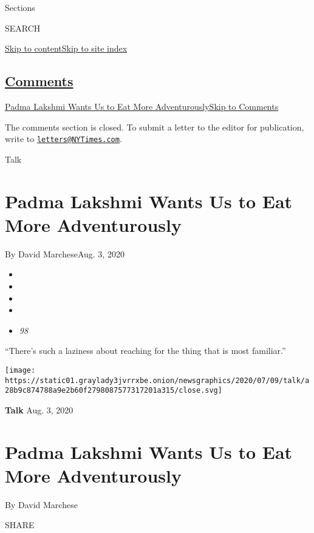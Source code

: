 Sections

SEARCH

\protect\hyperlink{site-content}{Skip to
content}\protect\hyperlink{site-index}{Skip to site index}

\hypertarget{comments}{%
\subsection{\texorpdfstring{\protect\hyperlink{commentsContainer}{Comments}}{Comments}}\label{comments}}

\href{}{Padma Lakshmi Wants Us to Eat More Adventurously}\href{}{Skip to
Comments}

The comments section is closed. To submit a letter to the editor for
publication, write to
\href{mailto:letters@NYTimes.com}{\nolinkurl{letters@NYTimes.com}}.

Talk

\hypertarget{padma-lakshmi-wants-us-to-eat-more-adventurously}{%
\section{Padma Lakshmi Wants Us to Eat More
Adventurously}\label{padma-lakshmi-wants-us-to-eat-more-adventurously}}

By David MarcheseAug. 3, 2020

\begin{itemize}
\item
\item
\item
\item
\item
  \emph{98}
\end{itemize}

``There's such a laziness about reaching for the thing that is most
familiar.''

\texttt{[image: https://static01.graylady3jvrrxbe.onion/newsgraphics/2020/07/09/talk/a28b9c874788a9e2b60f2798087577317201a315/close.svg]}

\textbf{Talk} Aug. 3, 2020

\hypertarget{padma-lakshmi-wants-us-to-eat-more-adventurously-1}{%
\section{Padma Lakshmi Wants Us to Eat More
Adventurously}\label{padma-lakshmi-wants-us-to-eat-more-adventurously-1}}

By David Marchese

SHARE

